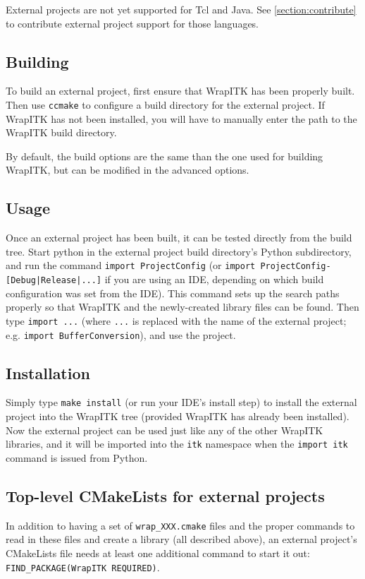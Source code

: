 \documentclass{InsightArticle}
\begin{document}
External projects are not yet supported for Tcl and Java. See \ref{section:contribute}
to contribute external project support for those languages.

    \subsection{Building}
To build an external project, first ensure that WrapITK has been properly built.
Then use \verb$ccmake$ to configure a build directory for the external project. If
WrapITK has not been installed, you will have to manually enter the path to the
WrapITK build directory.

By default, the build options are the same than the one used for building WrapITK,
but can be modified in the advanced options.

    \subsection{Usage}
Once an external project has been built, it can be tested directly from the
build tree. Start python in the external project build directory's Python
subdirectory, and run the command \verb$import ProjectConfig$ (or
\verb$import ProjectConfig-[Debug|Release|...]$ if you are using an IDE, depending on which
build configuration was set from the IDE). This command sets up the search paths
properly so that WrapITK and the newly-created library files can be found. Then
type \verb$import ...$ (where \verb$...$ is replaced with the name of the external
project; e.g. \verb$import BufferConversion$), and use the project.

    \subsection{Installation}
Simply type \verb$make install$ (or run your IDE's install step) to install the
external project into the WrapITK tree (provided WrapITK has already been
installed). Now the external project can be used just like any of the other
WrapITK libraries, and it will be imported into the \verb$itk$ namespace when the
\verb$import itk$ command is issued from Python.

    \subsection{Top-level CMakeLists for external projects}
In addition to having a set of \verb$wrap_XXX.cmake$ files and the proper
commands to read in these files and create a library (all described above), an
external project's CMakeLists file needs at least one additional command to
start it out: \verb$FIND_PACKAGE(WrapITK REQUIRED)$.
\end{document}
